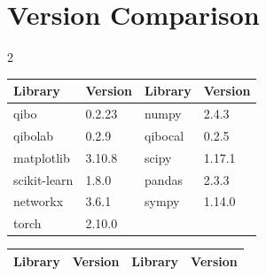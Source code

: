 \documentclass[9pt,a4paper]{src/templates/tau-class/tau}
\begin{document}
\section{Version Comparison}
\begin{multicols}{2}

\begin{tauenv}
\begin{center}
\begin{tabular}{@{}ll|ll@{}}
\toprule
\textbf{Library} & \textbf{Version} & \textbf{Library} & \textbf{Version} \\ \midrule


    qibo & 0.2.23 
    
        & numpy & 2.4.3 \\
    

    qibolab & 0.2.9 
    
        & qibocal & 0.2.5 \\
    

    matplotlib & 3.10.8 
    
        & scipy & 1.17.1 \\
    

    scikit-learn & 1.8.0 
    
        & pandas & 2.3.3 \\
    

    networkx & 3.6.1 
    
        & sympy & 1.14.0 \\
    

    torch & 2.10.0 
    
        & & \\
    

\bottomrule
\end{tabular}
\end{center}
\hspace{1cm}
\begin{minipage}{0.45\linewidth}

\end{minipage}
\end{tauenv}

\columnbreak

\begin{tauenv}
\begin{center}
\begin{tabular}{@{}ll|ll@{}}
\toprule
\textbf{Library} & \textbf{Version} & \textbf{Library} & \textbf{Version} \\ \midrule



\end{tabular}
\end{center}
\end{tauenv}
\end{multicols}
\end{document}
